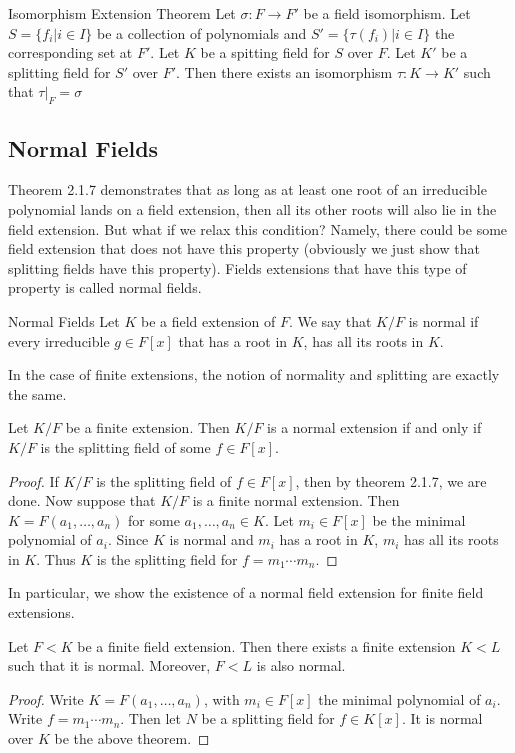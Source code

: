 \documentclass[a4paper]{article}
\begin{document}
\begin{thm}{Isomorphism Extension Theorem}{} Let $\sigma:F\to F'$ be a field isomorphism. Let $S=\{f_i|i\in I\}$ be a collection of polynomials and $S'=\{\tau(f_i)|i\in I\}$ the corresponding set at $F'$. Let $K$ be a spitting field for $S$ over $F$. Let $K'$ be a splitting field for $S'$ over $F'$. Then there exists an isomorphism $\tau:K\to K'$ such that $\tau|_F=\sigma$
\end{thm}


\subsection{Normal Fields}
Theorem 2.1.7 demonstrates that as long as at least one root of an irreducible polynomial lands on a field extension, then all its other roots will also lie in the field extension. But what if we relax this condition? Namely, there could be some field extension that does not have this property (obviously we just show that splitting fields have this property). Fields extensions that have this type of property is called normal fields. 

\begin{defn}{Normal Fields}{} Let $K$ be a field extension of $F$. We say that $K/F$ is normal if every irreducible $g\in F[x]$ that has a root in $K$, has all its roots in $K$. 
\end{defn}

In the case of finite extensions, the notion of normality and splitting are exactly the same. 

\begin{lmm}{}{} Let $K/F$ be a finite extension. Then $K/F$ is a normal extension if and only if $K/F$ is the splitting field of some $f\in F[x]$. \tcbline
\begin{proof}
If $K/F$ is the splitting field of $f\in F[x]$, then by theorem 2.1.7, we are done. Now suppose that $K/F$ is a finite normal extension. Then $K=F(a_1,\dots,a_n)$ for some $a_1,\dots,a_n\in K$. Let $m_i\in F[x]$ be the minimal polynomial of $a_i$. Since $K$ is normal and $m_i$ has a root in $K$, $m_i$ has all its roots in $K$. Thus $K$ is the splitting field for $f=m_1\cdots m_n$. 
\end{proof}
\end{lmm}

In particular, we show the existence of a normal field extension for finite field extensions. 

\begin{crl}{}{} Let $F<K$ be a finite field extension. Then there exists a finite extension $K<L$ such that it is normal. Moreover, $F<L$ is also normal. \tcbline
\begin{proof}
Write $K=F(a_1,\dots,a_n)$, with $m_i\in F[x]$ the minimal polynomial of $a_i$. Write $f=m_1\cdots m_n$. Then let $N$ be a splitting field for $f\in K[x]$. It is normal over $K$ be the above theorem. 
\end{proof}
\end{crl}
\end{document}
